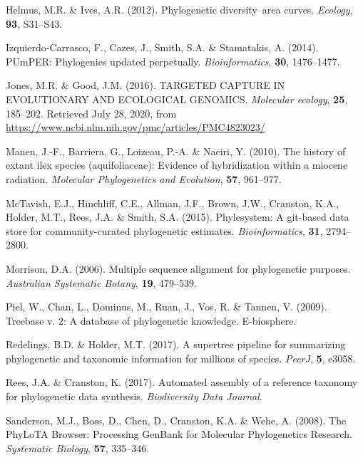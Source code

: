 \documentclass[]{article}
\begin{document}
\leavevmode\hypertarget{ref-helmus2012phylogenetic}{}%
Helmus, M.R. \& Ives, A.R. (2012). Phylogenetic diversity--area curves. \emph{Ecology}, \textbf{93}, S31--S43.

\leavevmode\hypertarget{ref-izquierdo2014pumper}{}%
Izquierdo-Carrasco, F., Cazes, J., Smith, S.A. \& Stamatakis, A. (2014). PUmPER: Phylogenies updated perpetually. \emph{Bioinformatics}, \textbf{30}, 1476--1477.

\leavevmode\hypertarget{ref-jones2016targeted}{}%
Jones, M.R. \& Good, J.M. (2016). TARGETED CAPTURE IN EVOLUTIONARY AND ECOLOGICAL GENOMICS. \emph{Molecular ecology}, \textbf{25}, 185--202. Retrieved July 28, 2020, from \url{https://www.ncbi.nlm.nih.gov/pmc/articles/PMC4823023/}

\leavevmode\hypertarget{ref-manen2010history}{}%
Manen, J.-F., Barriera, G., Loizeau, P.-A. \& Naciri, Y. (2010). The history of extant ilex species (aquifoliaceae): Evidence of hybridization within a miocene radiation. \emph{Molecular Phylogenetics and Evolution}, \textbf{57}, 961--977.

\leavevmode\hypertarget{ref-mctavish2015phylesystem}{}%
McTavish, E.J., Hinchliff, C.E., Allman, J.F., Brown, J.W., Cranston, K.A., Holder, M.T., Rees, J.A. \& Smith, S.A. (2015). Phylesystem: A git-based data store for community-curated phylogenetic estimates. \emph{Bioinformatics}, \textbf{31}, 2794--2800.

\leavevmode\hypertarget{ref-morrison2006multiple}{}%
Morrison, D.A. (2006). Multiple sequence alignment for phylogenetic purposes. \emph{Australian Systematic Botany}, \textbf{19}, 479--539.

\leavevmode\hypertarget{ref-piel2009treebase}{}%
Piel, W., Chan, L., Dominus, M., Ruan, J., Vos, R. \& Tannen, V. (2009). Treebase v. 2: A database of phylogenetic knowledge. E-biosphere.

\leavevmode\hypertarget{ref-redelings2017supertree}{}%
Redelings, B.D. \& Holder, M.T. (2017). A supertree pipeline for summarizing phylogenetic and taxonomic information for millions of species. \emph{PeerJ}, \textbf{5}, e3058.

\leavevmode\hypertarget{ref-rees2017automated}{}%
Rees, J.A. \& Cranston, K. (2017). Automated assembly of a reference taxonomy for phylogenetic data synthesis. \emph{Biodiversity Data Journal}.

\leavevmode\hypertarget{ref-sanderson2008phylota}{}%
Sanderson, M.J., Boss, D., Chen, D., Cranston, K.A. \& Wehe, A. (2008). The PhyLoTA Browser: Processing GenBank for Molecular Phylogenetics Research. \emph{Systematic Biology}, \textbf{57}, 335--346.
\end{document}
